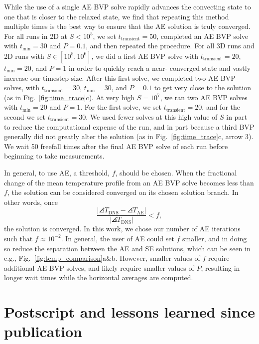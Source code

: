 While the use of a single AE BVP solve rapidly advances the convecting state to
one that is closer to the relaxed state, we find that repeating this method 
multiple times is the best way to
ensure that the AE solution is truly converged. For all runs in 2D at $S < 10^5$, we
set $t_{\text{transient}} = 50$, completed an AE BVP solve
with $t_{\text{min}} = 30$ and $P = 0.1$, and then repeated the procedure.
For all 3D runs and 2D runs with $S \in [10^5, 10^6]$,
we did a first AE BVP solve with $t_{\text{transient}} = 20$,
$t_{\text{min}} = 20$, and $P = 1$ in order to quickly reach a near-
converged state and vastly increase our timestep size.  After this first solve, 
we completed two AE BVP solves, with $t_{\text{transient}} = 30$,
$t_{\text{min}} = 30$, 
and $P = 0.1$ to get very close to the solution (as in Fig.~\ref{fig:time_trace}c).
At very high $S = 10^7$, we ran two AE BVP solves with $t_{\text{min}} = 20$ and
$P = 1$. For the first solve, we set $t_{\text{transient}} = 20$, and for the
second we set $t_{\text{transient}} = 30$. We used fewer solves at this high
value of $S$ in part to reduce the computational expense of the run, and in
part because a third BVP generally did not greatly alter the solution
(as in Fig.~\ref{fig:time_trace}c, arrow 3). We wait 50 freefall times after
the final AE BVP solve of each run before beginning to take measurements.

In general, to use AE, a threshold, $f$, should be chosen. When the fractional
change of the mean temperature profile from an AE BVP solve becomes less than $f$,
the solution can be considered converged on its chosen solution branch.
In other words, once
\begin{equation}
\frac{|\angles{T}_{\text{DNS}} - \angles{T}_{\text{AE}}|}{|\angles{T}_{\text{DNS}}|} < f,
\end{equation}
the solution is converged. In this work, we chose our number of AE iterations
such that $f \approx 10^{-2}$.  In general, the user of AE could
set $f$ smaller, and in doing so reduce the separation between the AE and SE
solutions, which can be seen in e.g., Fig.~\ref{fig:temp_comparison}a\&b. However,
smaller values of $f$ require additional AE BVP solves, and likely require smaller values
of $P$, resulting in longer wait times while the horizontal averages are computed.



\section{Postscript and lessons learned since publication}
